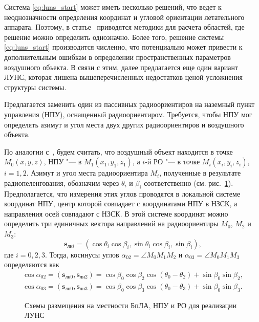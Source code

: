 \documentclass[../main.tex]{subfiles}
\begin{document}
Система \eqref{eq:luns_start} может иметь несколько решений, что ведет к неоднозначности определения координат и угловой ориентации летательного аппарата. Поэтому, в статье~\cite{antennas} приводятся методики для расчета областей, где решение можно определить однозначно. Более того, решение системы \eqref{eq:luns_start} производится численно, что потенциально может привести к дополнительным ошибкам в определении пространственных параметров воздушного объекта. В связи с этим, далее предлагается еще один вариант ЛУНС, которая лишена вышеперечисленных недостатков ценой усложнения структуры системы.

Предлагается заменить один из пассивных радиоориентиров на наземный пункт управления (НПУ), оснащенный радиоориентиром. Требуется, чтобы НПУ мог определять азимут и угол места двух других радиоориентиров и воздушного объекта.

По аналогии с~\cite{antennas}, будем считать, что воздушный объект находится в точке $M_0\left(x, y, z\right)$, НПУ "--- в $M_1\left(x_1, y_1, z_1\right)$, а $i$-й РО "--- в точке $M_i\left(x_i, y_i, z_i \right)$, $i = 1,2$. Азимут и угол места радиоориентира $M_i$, полученные в результате радиопеленгования, обозначим через $\theta_i$ и $\beta_i$ соответственно (см. рис.~\ref{fig:systems:pic1}). Предполагается, что измерения этих углов проводятся в локальной системе координат НПУ, центр которой совпадает с координатами НПУ в НЗСК, а направления осей совпадают с НЗСК. В этой системе координат можно определить три единичных вектора направлений на радиоориентиры $M_0$, $M_2$ и $M_3$:
\begin{equation*}
  \mathbf{s}_{\text{лн}i} = \left(\cos\theta_i \cos\beta_i, \sin\theta_i\cos\beta_i, \sin\beta_i\right),
\end{equation*}
где $i = 0, 2, 3$. Тогда, косинусы углов $\alpha_{02} = \angle M_0 M_1 M_2$ и $\alpha_{03} = \angle M_0 M_1 M_3$ определяются как
\begin{align*}
  \cos\alpha_{02} = \left(\mathbf{s}_{\text{лн}0}, \mathbf{s}_{\text{лн}2}\right) =
  \cos\beta_0 \cos\beta_2 \cos\left(\theta_0 - \theta_2\right) + \sin\beta_0 \sin\beta_2, \\
  \cos\alpha_{03} = \left(\mathbf{s}_{\text{лн}0}, \mathbf{s}_{\text{лн}3}\right) =
  \cos\beta_0 \cos\beta_3 \cos\left(\theta_0 - \theta_3\right) + \sin\beta_0 \sin\beta_3.
\end{align*}

\begin{figure}[htbp]
  \centering


  \caption{Схемы размещения на местности БпЛА, НПУ и РО для реализации ЛУНС}
  \label{fig:systems:pic1}
\end{figure}
\end{document}
